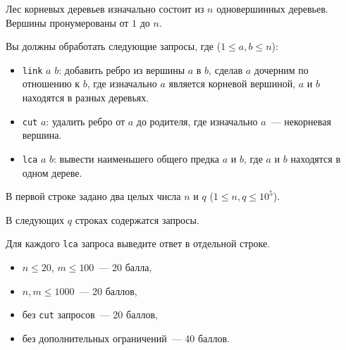 
\Legend
Лес корневых деревьев изначально состоит из $n$ одновершинных деревьев. Вершины пронумерованы от $1$ до $n$.

Вы должны обработать следующие запросы, где ($1 \le a, b \le n$):

\begin{itemize}
	\item \texttt{link} $a$ $b$: добавить ребро из вершины $a$ в $b$, сделав $a$ дочерним по отношению к $b$, где изначально $a$ является корневой вершиной, $a$ и $b$ находятся в разных деревьях.
	\item \texttt{cut} $a$: удалить ребро от $a$ до родителя, где изначально $a$~--- некорневая вершина.
	\item \texttt{lca} $a$ $b$: вывести наименьшего общего предка $a$ и $b$, где $a$ и $b$ находятся в одном дереве.
\end{itemize}

\Input
В первой строке задано два целых числа $n$ и $q$ ($1 \le n, q \le 10^5$).

В следующих $q$ строках содержатся запросы.

\Output
Для каждого \texttt{lca} запроса выведите ответ в отдельной строке.

\Samples
\BeginTests
\EndTests

\Scoring
\begin{itemize}
	\item $n \le 20$, $m \le 100$~--- 20 балла,
	\item $n, m \le 1000$~--- 20 баллов,
	\item без \texttt{cut} запросов~--- 20 баллов,
	\item без дополнительных ограничений~--- 40 баллов.
\end{itemize}

\EndProblem
